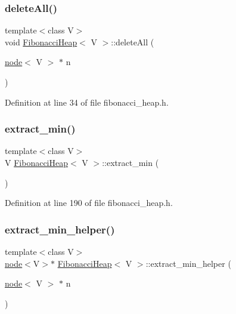 \subsubsection{\texorpdfstring{delete\+All()}{deleteAll()}}
{\footnotesize\ttfamily template$<$class V$>$ \\
void \hyperlink{class_fibonacci_heap}{Fibonacci\+Heap}$<$ V $>$\+::delete\+All (\begin{DoxyParamCaption}\item[{\hyperlink{structnode}{node}$<$ V $>$ $\ast$}]{n }\end{DoxyParamCaption})\hspace{0.3cm}{\ttfamily [inline]}}



Definition at line 34 of file fibonacci\+\_\+heap.\+h.

\mbox{\label{class_fibonacci_heap_ad483e2607e101d410781fb52bb3099ac}} 
\subsubsection{\texorpdfstring{extract\+\_\+min()}{extract\_min()}}
{\footnotesize\ttfamily template$<$class V$>$ \\
V \hyperlink{class_fibonacci_heap}{Fibonacci\+Heap}$<$ V $>$\+::extract\+\_\+min (\begin{DoxyParamCaption}{ }\end{DoxyParamCaption})\hspace{0.3cm}{\ttfamily [inline]}}



Definition at line 190 of file fibonacci\+\_\+heap.\+h.

\mbox{\label{class_fibonacci_heap_a0ce9ea86a726ae81bcd8935bff6dc954}} 
\subsubsection{\texorpdfstring{extract\+\_\+min\+\_\+helper()}{extract\_min\_helper()}}
{\footnotesize\ttfamily template$<$class V$>$ \\
\hyperlink{structnode}{node}$<$V$>$$\ast$ \hyperlink{class_fibonacci_heap}{Fibonacci\+Heap}$<$ V $>$\+::extract\+\_\+min\+\_\+helper (\begin{DoxyParamCaption}\item[{\hyperlink{structnode}{node}$<$ V $>$ $\ast$}]{n }\end{DoxyParamCaption})\hspace{0.3cm}{\ttfamily [inline]}}



